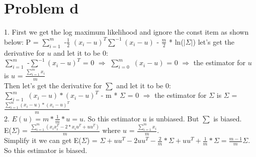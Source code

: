 \documentclass[twoside,11pt]{homework}
\begin{document}
\section*{Problem d}
1. First we get the log maximum likelihood and ignore the const item as shown below:
P = $\sum_{i=1}^{m}$ -$\frac{1}{2}$ $(x_{i} - u)^{T} \sum^{-1} (x_{i} - u)$ - $\frac{m}{2}$ * ln($|\Sigma|$)
let's get the derivative for $u$ and let it to be 0: \\
$\sum_{i=1}^{m}$ -$\sum^{-1} (x_{i} - u)^{T}$ = 0 $\Longrightarrow$ $\sum_{i=0}^{m}$ $(x_{i} - u)$ = 0 $\Longrightarrow$ the estimator for $u$ is $u$ = $\frac{\sum_{i=1}^{m}x_{i}}{m}$  \\
Then let's get the derivative for $\sum$ and let it to be 0: \\
 $\sum_{i=1}^{m}$ $(x_{i} - u) * (x_{i} - u)^{T}$ - m * $\Sigma$ = 0 $\Longrightarrow$ the estimator for $\Sigma$ is $\Sigma$ = $\frac{\sum_{i=1}^{m} (x_{i} - u) * (x_{i} - u)^{T}}{m}$ \\
 2. $E(u) = m * \frac{1}{m} * u = u$. So this estimator $u$ is unbiased. But $\sum$ is biased. \\
 E($\Sigma$) = $\frac {\sum_{i=1}^{m} (x_{i}x_{i}^{T} - 2 * x_{i} u^{T} +  uu^{T})}{m} $ where $u$ = $\frac{\sum_{i=1}^{m}x_{i}}{m}$. \\
 Simplify it we can get  E($\Sigma$) = $\Sigma + uu^{T} - 2uu^{T} - \frac{2}{m} * \Sigma + uu^{T} +  \frac{1}{m} * \Sigma = \frac{m - 1}{m} \Sigma$. So this estimator is biased.
\end{document}
